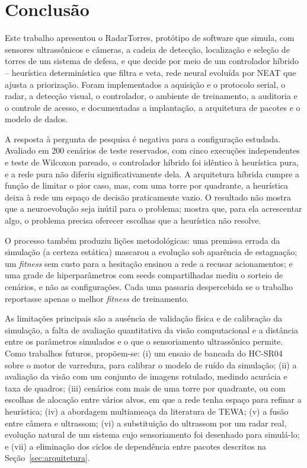 \documentclass[12pt,a4paper]{article}
\begin{document}
\section{Conclusão}

Este trabalho apresentou o RadarTorres, protótipo de software que simula, com sensores
ultrassônicos e câmeras, a cadeia de detecção, localização e seleção de torres de um sistema de
defesa, e que decide por meio de um controlador híbrido -- heurística determinística que filtra e
veta, rede neural evoluída por NEAT que ajusta a priorização. Foram implementados a aquisição e o
protocolo serial, o radar, a detecção visual, o controlador, o ambiente de treinamento, a auditoria
e o controle de acesso, e documentadas a implantação, a arquitetura de pacotes e o modelo de dados.

A resposta à pergunta de pesquisa é negativa para a configuração estudada. Avaliado em 200 cenários
de teste reservados, com cinco execuções independentes e teste de Wilcoxon pareado, o controlador
híbrido foi idêntico à heurística pura, e a rede pura não diferiu significativamente dela. A
arquitetura híbrida cumpre a função de limitar o pior caso, mas, com uma torre por quadrante, a
heurística deixa à rede um espaço de decisão praticamente vazio. O resultado não mostra que a
neuroevolução seja inútil para o problema; mostra que, para ela acrescentar algo, o problema precisa
oferecer escolhas que a heurística não resolve.

O processo também produziu lições metodológicas: uma premissa errada da simulação (a certeza
estática) mascarou a evolução sob aparência de estagnação; um \textit{fitness} sem custo para a
hesitação ensinou a rede a recusar acionamentos; e uma grade de hiperparâmetros com seeds
compartilhadas mediu o sorteio de cenários, e não as configurações. Cada uma passaria despercebida se
o trabalho reportasse apenas o melhor \textit{fitness} de treinamento.

As limitações principais são a ausência de validação física e de calibração da simulação, a falta de
avaliação quantitativa da visão computacional e a distância entre os parâmetros simulados e o que o
sensoriamento ultrassônico permite. Como trabalhos futuros, propõem-se: (i) um ensaio de bancada do
HC-SR04 sobre o motor de varredura, para calibrar o modelo de ruído da simulação; (ii) a avaliação
da visão com um conjunto de imagens rotulado, medindo acurácia e taxa de quadros; (iii) cenários com
mais de uma torre por quadrante, ou com escolhas de alocação entre vários alvos, em que a rede tenha
espaço para refinar a heurística; (iv) a abordagem multiameaça da literatura de TEWA; (v) a fusão
entre câmera e ultrassom; (vi) a substituição do ultrassom por um radar real, evolução natural de
um sistema cujo sensoriamento foi desenhado para simulá-lo; e (vii) a eliminação dos ciclos de
dependência entre pacotes descritos na Seção~\ref{sec:arquitetura}.


\end{document}
